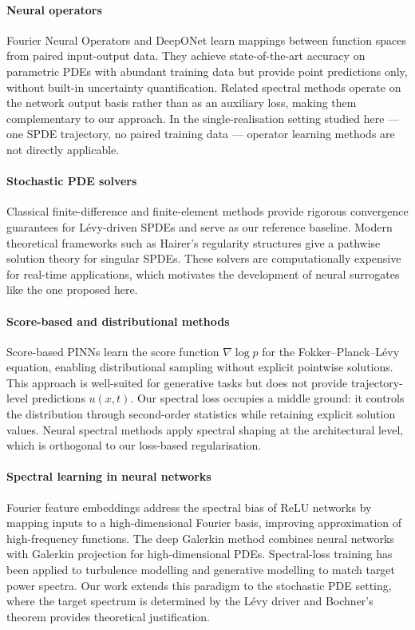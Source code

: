 \documentclass[times,12pt]{elsarticle}
\begin{document}
\paragraph{Neural operators}
Fourier Neural Operators \cite{Li2021FNO} and DeepONet \cite{Lu2021DeepONet}
learn mappings between function spaces from paired input-output data. They
achieve state-of-the-art accuracy on parametric PDEs with abundant training
data but provide point predictions only, without built-in uncertainty
quantification. Related spectral methods \cite{DuEtAl2024NSM} operate on the
network output basis rather than as an auxiliary loss, making them
complementary to our approach. In the single-realisation setting studied here
--- one SPDE trajectory, no paired training data --- operator learning methods
are not directly applicable.

\paragraph{Stochastic PDE solvers}
Classical finite-difference and finite-element methods \cite{Lord2014, DaPrato2014}
provide rigorous convergence guarantees for L\'evy-driven SPDEs and serve as our
reference baseline. Modern theoretical frameworks such as Hairer's regularity
structures \cite{Hairer2014} give a pathwise solution theory for singular SPDEs.
These solvers are computationally expensive for real-time applications, which
motivates the development of neural surrogates like the one proposed here.

\paragraph{Score-based and distributional methods}
Score-based PINNs \cite{Hu2024ScoreFPINN} learn the score function $\nabla \log p$
for the Fokker--Planck--L\'evy equation, enabling distributional sampling without
explicit pointwise solutions. This approach is well-suited for generative tasks
but does not provide trajectory-level predictions $u(x,t)$. Our spectral loss
occupies a middle ground: it controls the distribution through second-order
statistics while retaining explicit solution values. Neural spectral methods
\cite{Worrall2025SpectralShaping} apply spectral shaping at the architectural
level, which is orthogonal to our loss-based regularisation.

\paragraph{Spectral learning in neural networks}
Fourier feature embeddings \cite{Tancik2020} address the spectral bias of
ReLU networks by mapping inputs to a high-dimensional Fourier basis, improving
approximation of high-frequency functions. The deep Galerkin method
\cite{Sirignano2018} combines neural networks with Galerkin projection for
high-dimensional PDEs. Spectral-loss training has been applied to turbulence
modelling \cite{Kim2024Turb} and generative modelling \cite{Durall2020,
Engel2020DDSP} to match target power spectra. Our work extends this paradigm
to the stochastic PDE setting, where the target spectrum is determined by the
L\'evy driver and Bochner's theorem provides theoretical justification.
\end{document}

